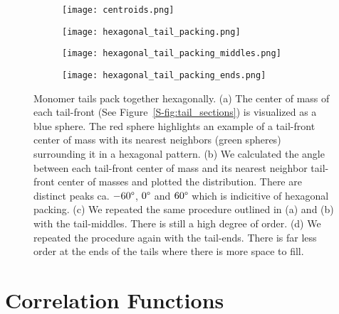   \begin{figure}[!htb]
        \centering
        \begin{subfigure}{0.45\textwidth}
        \texttt{[image: centroids.png]}
		\caption{}\label{S-fig:centroids}
        \end{subfigure}
        \begin{subfigure}{0.45\textwidth}
        \texttt{[image: hexagonal\_tail\_packing.png]}
        \caption{}\label{S-fig:tail_fronts}
        \end{subfigure}
        \begin{subfigure}{0.45\textwidth}
        \texttt{[image: hexagonal\_tail\_packing\_middles.png]}
        \caption{}\label{S-fig:tail_middles}
        \end{subfigure}
        \begin{subfigure}{0.45\textwidth}
        \texttt{[image: hexagonal\_tail\_packing\_ends.png]}
        \caption{}\label{S-fig:tail_ends}
        \end{subfigure}
        \caption{Monomer tails pack together hexagonally. (a) The center of mass
        of each tail-front (See Figure~\ref{S-fig:tail_sections}) is visualized as
        a blue sphere. The red sphere highlights an example of a tail-front 
        center of mass with its nearest neighbors (green spheres) surrounding it
        in a hexagonal pattern. (b) We calculated the angle between each tail-front
        center of mass and its nearest neighbor tail-front center of masses and 
        plotted the distribution. There are distinct peaks ca. $-60\degree$, $0\degree$ and
        $60\degree$ which is indicitive of hexagonal packing. (c) We repeated the 
        same procedure outlined in (a) and (b) with the tail-middles. There is still 
        a high degree of order. (d) We repeated the procedure again with the tail-ends.
        There is far less order at the ends of the tails where there is more
        space to fill.}\label{S-fig:tail_packing}
  \end{figure}
  
  \clearpage
  
  \section{Correlation Functions}\label{S-section:correlation_functions}
  
